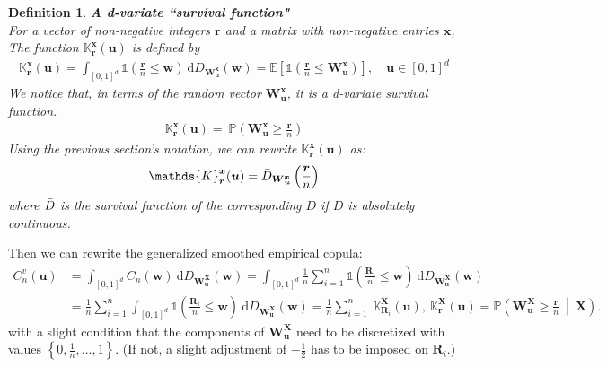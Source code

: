 \documentclass[12pt]{report}
\newtheorem{definition}{Definition}[subsection]
\newcommand{\1}{\mathbf{1}}
\begin{document}
\begin{definition}\label{K function}
\textit{\normalfont\parencite{KojadinovicYi2024Smooth}}\:
\textbf{A d-variate ``survival function"} \\
For a vector of non-negative integers $\boldsymbol{r}$ and a matrix with non-negative entries $\boldsymbol{x}$, The function $\mathds{K}_{\boldsymbol{r}}^{\boldsymbol{x}}(\boldsymbol{u})$ is defined by
\begin{align*}
\mathds{K}_{\boldsymbol{r}}^{\boldsymbol{x}}(\boldsymbol{u}) = \int_{[0,1]^d} \mathds{1}\left(\frac{\boldsymbol{r}}{n} \le \boldsymbol{w}\right) \: \mathrm{d}D_{\boldsymbol{W}_{\boldsymbol{u}}^{\boldsymbol{x}}}(\boldsymbol{w}) = \mathbb{E} \left[ \mathds{1}(\frac{\boldsymbol{r}}{n} \le \boldsymbol{W}^{\boldsymbol{x}}_{\boldsymbol{u}}) \right], \quad \boldsymbol{u} \in [0,1]^{d}
\end{align*}
We notice that, in terms of the random vector $\boldsymbol{W}^{\boldsymbol{x}}_{\boldsymbol{u}}$, it is a d-variate survival function.
\begin{align*}
\mathds{K}_{\boldsymbol{r}}^{\boldsymbol{x}}(\boldsymbol{u}) = \
\mathbb{P} \left( \boldsymbol{W}^{\boldsymbol{x}}_{\boldsymbol{u}} \ge \frac{\boldsymbol{r}}{n} \right)
\end{align*}
Using the previous section's notation, we can rewrite $\mathds{K}_{\boldsymbol{r}}^{\boldsymbol{x}}(\boldsymbol{u})$ as:
\begin{align*}
\mathds{K}_{\boldsymbol{r}}^{\boldsymbol{x}}(\boldsymbol{u}) = \Bar{D}_{\boldsymbol{W}^{\boldsymbol{x}}_{\boldsymbol{u}}}\left(\frac{\boldsymbol{r}}{n}\right)
\end{align*}
where $\Bar{D}$ is the survival function of the corresponding $D$ if $D$ is absolutely continuous.
\end{definition}
Then we can rewrite the generalized smoothed empirical copula:
\begin{align*}
C_{n}^{v}(\boldsymbol{u}) &= \int_{[0,1]^d} C_{n}(\boldsymbol{w}) \: \mathrm{d}D_{\boldsymbol{W}_{\boldsymbol{u}}^{\boldsymbol{X}}}(\boldsymbol{w})
= \int_{[0,1]^d} \frac{1}{n} \sum\limits_{i = 1}^{n} \mathds{1}\left(\frac{\boldsymbol{R_{i}}}{n} \le \boldsymbol{w}\right) \: \mathrm{d}D_{\boldsymbol{W}_{\boldsymbol{u}}^{\boldsymbol{X}}}(\boldsymbol{w}) \\
&= \frac{1}{n} \sum\limits_{i = 1}^{n} \int_{[0,1]^d}  \mathds{1}\left(\frac{\boldsymbol{R_{i}}}{n} \le \boldsymbol{w}\right) \: \mathrm{d}D_{\boldsymbol{W}_{\boldsymbol{u}}^{\boldsymbol{X}}}(\boldsymbol{w}) 
= \frac{1}{n} \sum\limits_{i = 1}^{n} \: \mathds{K}_{\boldsymbol{R}_{i}}^{\boldsymbol{X}}(\boldsymbol{u}), \:
\mathds{K}_{\boldsymbol{r}}^{\boldsymbol{X}}(\boldsymbol{u}) = \mathbb{P} \left( \boldsymbol{W}^{\boldsymbol{X}}_{\boldsymbol{u}} \ge \frac{\boldsymbol{r}}{n} \: \middle| \: \boldsymbol{X} \right).
\end{align*}
with a slight condition that the components of $\boldsymbol{W}^{\boldsymbol{X}}_{\boldsymbol{u}}$ need to be discretized \parencite{KojadinovicYi2024Smooth} with values $\left\{0,\frac{1}{n}, \dots, 1 \right\}$. (If not, a slight adjustment of $-\frac{1}{2}$ has to be imposed on $\boldsymbol{R}_{i}$.)
\end{document}
